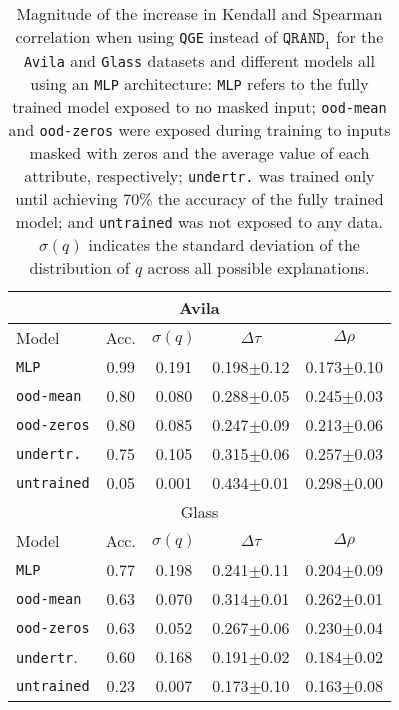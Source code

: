 \begin{table}[!t]
    \vskip 0.15in
    \begin{center}
    \begin{small}
    \begin{sc}
    \begin{tabular}{l|c|c|c|c}
        \multicolumn{5}{c}{{Avila}} \\
        \hline
        Model & Acc. & $\sigma(q)$ &$\Delta \tau$ & $\Delta\rho$\\
        \toprule
        \texttt{MLP} & 0.99 & 0.191 & 0.198$\pm$0.12 & 0.173$\pm$0.10\\
        \texttt{ood-mean} & 0.80 & 0.080 & 0.288$\pm$0.05 & 0.245$\pm$0.03\\
        \texttt{ood-zeros} & 0.80 & 0.085 & 0.247$\pm$0.09 & 0.213$\pm$0.06\\
        \texttt{undertr.} & 0.75 & 0.105 & 0.315$\pm$0.06 & 0.257$\pm$0.03\\
        \texttt{untrained} & 0.05 & 0.001 & 0.434$\pm$0.01 & 0.298$\pm$0.00\\
        \hline
        \multicolumn{5}{c}{{Glass}}\\
        \hline
        Model & Acc. & $\sigma(q)$ &$\Delta \tau$ & $\Delta\rho$\\
        \toprule
        \texttt{MLP} & 0.77 & 0.198 & 0.241$\pm$0.11 & 0.204$\pm$0.09\\
        \texttt{ood-mean} & 0.63 & 0.070 & 0.314$\pm$0.01 & 0.262$\pm$0.01\\
        \texttt{ood-zeros} & 0.63 & 0.052 & 0.267$\pm$0.06 & 0.230$\pm$0.04\\
        \texttt{undertr}. & 0.60 & 0.168 & 0.191$\pm$0.02 & 0.184$\pm$0.02\\
        \texttt{untrained} & 0.23 & 0.007 & 0.173$\pm$0.10 & 0.163$\pm$0.08\\
        \hline
    \end{tabular}
    \end{sc}
    \end{small}
    \end{center}
    \caption{Magnitude of the increase in Kendall and Spearman correlation when using \texttt{QGE} instead of $\texttt{QRAND}_1$ for the \texttt{Avila} and \texttt{Glass} datasets and different models all using an \texttt{MLP} architecture: \texttt{MLP} refers to the fully trained model exposed to no masked input; \texttt{ood-mean} and \texttt{ood-zeros} were exposed during training to inputs masked with zeros and the average value of each attribute, respectively; \texttt{undertr.} was trained only until achieving 70\% the accuracy of the fully trained model; and \texttt{untrained} was not exposed to any data. $\sigma(q)$ indicates the standard deviation of the distribution of $q$ across all possible explanations.}\label{tab:effects_per_model}
\end{table}

